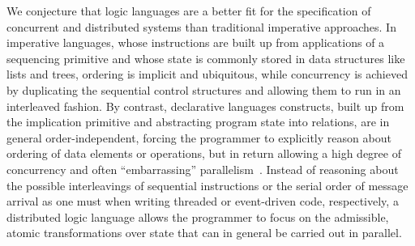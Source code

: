\begin{comment}
Consider a distributed system in which participants announce their presence with 
\emph{heartbeat} messages; participants that want to reason about who is present must
remember the message content and the time of its arrival.  It is natural to represent the messages 
themselves as events, and the log of messages and timestamps as a persistent table:

\begin{Dedalus}
heartbeat\_cache(@Host, Peer, Time) \(\leftarrow\) 
  heartbeat(@Host, Peer), local\_time(Time);
\end{Dedalus}

 Although the Overlog language permits the transparent
intermixing of the table types, their interaction is often unintuitive, and compromises the
reading of rules as logical implications.  The state of the system after the arrival of some
number of \emph{heartbeat} events is clearly not a minimal model of the given input database,
which does not contain the events that (for one moment) caused the derivation of 
\emph{heartbeat\_cache} tuples.



\end{comment}

We conjecture that logic languages are a better fit for the specification of concurrent and distributed systems than traditional imperative approaches.  In imperative languages, whose instructions are built up from applications of a sequencing primitive and whose state is commonly stored in data structures like lists and trees, ordering is implicit and ubiquitous, 
while concurrency is achieved by duplicating the sequential control structures and allowing them
to run in an interleaved fashion.  By contrast, declarative languages constructs, built up from the implication primitive and abstracting program state into relations, are in general order-independent, forcing the programmer to explicitly reason about ordering of data elements or operations, but in return allowing a high degree of concurrency and often ``embarrassing'' 
parallelism~\cite{podskey}.  Instead of reasoning about the possible interleavings of sequential
instructions or the serial order of message arrival as one must when writing threaded or 
event-driven code, respectively, a distributed logic language allows the programmer to focus
on the admissible, atomic transformations over state that can in general be carried out in
parallel.

